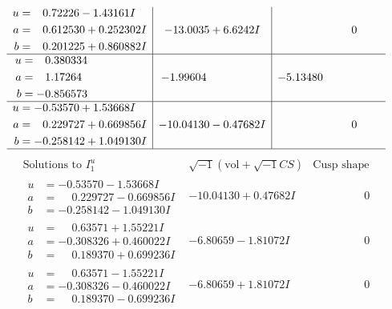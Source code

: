 \documentclass[1p]{elsarticle_modified}
\theoremstyle{definition}
\newcommand{\I}{\sqrt{-1}}
\begin{document}
$$\begin{array}{c|c|c}
\begin{aligned}
u &= \phantom{-}0.72226 - 1.43161 I \\
a &= \phantom{-}0.612530 + 0.252302 I \\
b &= \phantom{-}0.201225 + 0.860882 I\end{aligned}
 & -13.0035 + 6.6242 I & \phantom{-0.000000 } 0 \\ \hline\begin{aligned}
u &= \phantom{-}0.380334\phantom{ +0.000000I} \\
a &= \phantom{-}1.17264\phantom{ +0.000000I} \\
b &= -0.856573\phantom{ +0.000000I}\end{aligned}
 & -1.99604\phantom{ +0.000000I} & -5.13480\phantom{ +0.000000I} \\ \hline\begin{aligned}
u &= -0.53570 + 1.53668 I \\
a &= \phantom{-}0.229727 + 0.669856 I \\
b &= -0.258142 + 1.049130 I\end{aligned}
 & -10.04130 - 0.47682 I & \phantom{-0.000000 } 0\\
 \hline 
 \end{array}$$\newpage$$\begin{array}{c|c|c}  
\text{Solutions to }I^u_{1}& \I (\text{vol} + \sqrt{-1}CS) & \text{Cusp shape}\\
 \hline 
\begin{aligned}
u &= -0.53570 - 1.53668 I \\
a &= \phantom{-}0.229727 - 0.669856 I \\
b &= -0.258142 - 1.049130 I\end{aligned}
 & -10.04130 + 0.47682 I & \phantom{-0.000000 } 0 \\ \hline\begin{aligned}
u &= \phantom{-}0.63571 + 1.55221 I \\
a &= -0.308326 + 0.460022 I \\
b &= \phantom{-}0.189370 + 0.699236 I\end{aligned}
 & -6.80659 - 1.81072 I & \phantom{-0.000000 } 0 \\ \hline\begin{aligned}
u &= \phantom{-}0.63571 - 1.55221 I \\
a &= -0.308326 - 0.460022 I \\
b &= \phantom{-}0.189370 - 0.699236 I\end{aligned}
 & -6.80659 + 1.81072 I & \phantom{-0.000000 } 0 \\ \hline\begin{aligned}

\end{aligned}
\end{array}$$
\end{document}
